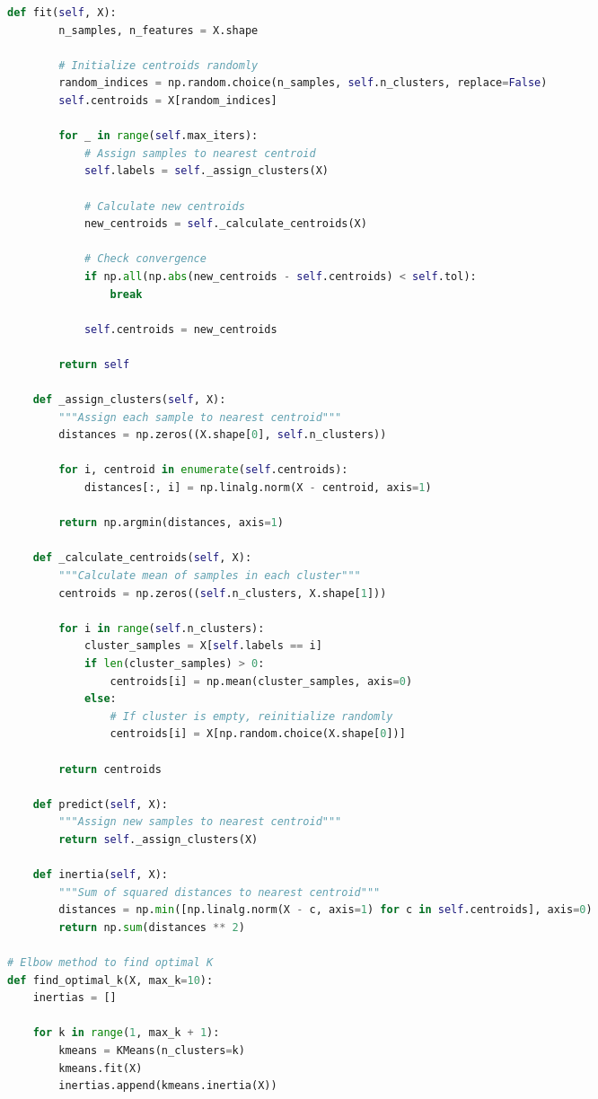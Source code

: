 \documentclass[8pt,landscape]{article}
\begin{document}
\begin{multicols}{3}
\begin{lstlisting}[language=Python]
    def fit(self, X):
        n_samples, n_features = X.shape

        # Initialize centroids randomly
        random_indices = np.random.choice(n_samples, self.n_clusters, replace=False)
        self.centroids = X[random_indices]

        for _ in range(self.max_iters):
            # Assign samples to nearest centroid
            self.labels = self._assign_clusters(X)

            # Calculate new centroids
            new_centroids = self._calculate_centroids(X)

            # Check convergence
            if np.all(np.abs(new_centroids - self.centroids) < self.tol):
                break

            self.centroids = new_centroids

        return self

    def _assign_clusters(self, X):
        """Assign each sample to nearest centroid"""
        distances = np.zeros((X.shape[0], self.n_clusters))

        for i, centroid in enumerate(self.centroids):
            distances[:, i] = np.linalg.norm(X - centroid, axis=1)

        return np.argmin(distances, axis=1)

    def _calculate_centroids(self, X):
        """Calculate mean of samples in each cluster"""
        centroids = np.zeros((self.n_clusters, X.shape[1]))

        for i in range(self.n_clusters):
            cluster_samples = X[self.labels == i]
            if len(cluster_samples) > 0:
                centroids[i] = np.mean(cluster_samples, axis=0)
            else:
                # If cluster is empty, reinitialize randomly
                centroids[i] = X[np.random.choice(X.shape[0])]

        return centroids

    def predict(self, X):
        """Assign new samples to nearest centroid"""
        return self._assign_clusters(X)

    def inertia(self, X):
        """Sum of squared distances to nearest centroid"""
        distances = np.min([np.linalg.norm(X - c, axis=1) for c in self.centroids], axis=0)
        return np.sum(distances ** 2)

# Elbow method to find optimal K
def find_optimal_k(X, max_k=10):
    inertias = []

    for k in range(1, max_k + 1):
        kmeans = KMeans(n_clusters=k)
        kmeans.fit(X)
        inertias.append(kmeans.inertia(X))


\end{lstlisting}
\end{multicols}
\end{document}

